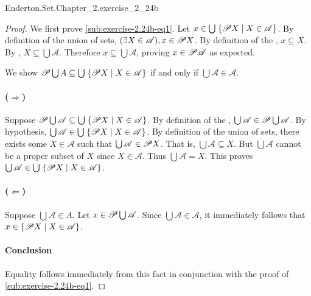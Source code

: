 \documentclass{report}
\begin{document}
    {Enderton.Set.Chapter\_2.exercise\_2\_24b}

  \begin{proof}
    We first prove \eqref{sub:exercise-2.24b-eq1}.
    Let $x \in \bigcup\; \{ \mathscr{P}X \mid X \in \mathscr{A} \}$.
    By definition of the union of sets,
      $(\exists X \in \mathscr{A}), x \in \mathscr{P}X$.
    By definition of the , $x \subseteq X$.
    By , $X \subseteq \bigcup \mathscr{A}$.
    Therefore $x \subseteq \bigcup \mathscr{A}$, proving
      $x \in \mathscr{P}\mathscr{A}$ as expected.

    \suitdivider

    \noindent
    We show $\mathscr{P}\bigcup A \subseteq 
      \bigcup\;\{ \mathscr{P}X \mid X \in \mathscr{A} \}$ if and only if
      $\bigcup\mathscr{A} \in \mathscr{A}$.

    \paragraph{($\Rightarrow$)}%

      Suppose $\mathscr{P}\bigcup\mathscr{A} \subseteq
        \bigcup\;\{ \mathscr{P}X \mid X \in \mathscr{A} \}$.
      By definition of the ,
        $\bigcup\mathscr{A} \in \mathscr{P}\bigcup\mathscr{A}$.
      By hypothesis, $\bigcup\mathscr{A} \in 
        \bigcup\;\{ \mathscr{P}X \mid X \in \mathscr{A} \}$.
      By definition of the union of sets, there exists some $X \in \mathscr{A}$
        such that $\bigcup\mathscr{A} \in \mathscr{P}X$.
      That is, $\bigcup\mathscr{A} \subseteq X$.
      But $\bigcup\mathscr{A}$ cannot be a proper subset of $X$ since
        $X \in \mathscr{A}$.
      Thus $\bigcup\mathscr{A} = X$.
      This proves $\bigcup\mathscr{A} \in
        \bigcup\;\{ \mathscr{P}X \mid X \in \mathscr{A} \}$.

    \paragraph{($\Leftarrow$)}%

      Suppose $\bigcup\mathscr{A} \in A$.
      Let $x \in \mathscr{P}\bigcup\mathscr{A}$.
      Since $\bigcup\mathscr{A} \in \mathscr{A}$, it immediately follows that
        $x \in \{\mathscr{P}X \mid X \in \mathscr{A}\}$.

    \paragraph{Conclusion}%

      Equality follows immediately from this fact in conjunction with the proof
        of \eqref{sub:exercise-2.24b-eq1}.

  \end{proof}
\end{document}

